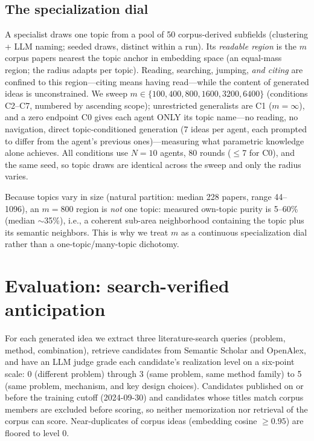 \documentclass{article} %
\begin{document}
\subsection{The specialization dial}
\label{sec:scopes}

A specialist draws one topic from a pool of 50 corpus-derived subfields
(clustering + LLM naming; seeded draws, distinct within a run). Its
\emph{readable region} is the $m$ corpus papers nearest the topic anchor
in embedding space (an equal-mass region; the radius adapts per topic).
Reading, searching, jumping, \emph{and citing} are confined to this
region---citing means having read---while the content of generated ideas
is unconstrained. We sweep $m \in \{100, 400, 800, 1600, 3200, 6400\}$
(conditions C2--C7, numbered by ascending scope); unrestricted
generalists are C1 ($m=\infty$), and a zero endpoint C0 gives each
agent ONLY its topic name---no reading, no navigation, direct
topic-conditioned generation (7 ideas per agent, each prompted to
differ from the agent's previous ones)---measuring what parametric
knowledge alone achieves. All
conditions use $N{=}10$ agents, 80 rounds ($\leq$7 for C0), and the
same seed, so topic draws are identical across the sweep and only the
radius varies.

Because topics vary in size (natural partition: median 228 papers, range
44--1096), an $m=800$ region is \emph{not} one topic: measured own-topic
purity is 5--60\% (median $\sim$35\%), i.e., a coherent sub-area
neighborhood containing the topic plus its semantic neighbors. This is
why we treat $m$ as a continuous specialization dial rather than a
one-topic/many-topic dichotomy.

\section{Evaluation: search-verified anticipation}
\label{sec:eval}

For each generated idea we extract three literature-search queries
(problem, method, combination), retrieve candidates from Semantic Scholar
and OpenAlex, and have an LLM judge grade each candidate's realization
level on a six-point scale: 0 (different problem) through 3 (same problem,
same method family) to 5 (same problem, mechanism, and key design
choices). Candidates published on or before the training cutoff
(2024-09-30) and candidates whose titles match corpus members are
excluded before scoring, so neither memorization nor retrieval of the
corpus can score. Near-duplicates of corpus ideas (embedding cosine
$\geq 0.95$) are floored to level 0.
\end{document}
